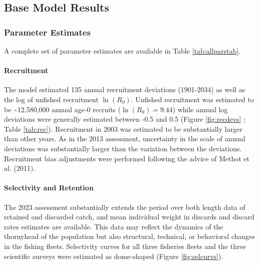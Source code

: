 \documentclass[11pt,
  english,
  letterpaper,
]{article}
\begin{document}
\hypertarget{base-model-results}{%
\subsection{Base Model Results}\label{base-model-results}}

\hypertarget{parameter-estimates}{%
\subsubsection{Parameter Estimates}\label{parameter-estimates}}

A complete set of parameter estimates are available in Table \ref{tab:allparstab}.

\hypertarget{recruitment-1}{%
\paragraph{Recruitment}\label{recruitment-1}}

The model estimated 135 annual recruitment deviations (1901-2034) as well as the log of unfished recruitment \(\ln(R_0)\). Unfished recruitment was estimated to be \textasciitilde12,580,000 annual age-0 recruits (\(\ln(R_0) = 9.44\)) while annual log deviations were generally estimated between -0.5 and 0.5 (Figure \ref{fig:recdevs} ; Table \ref{tab:rec}). Recruitment in 2003 was estimated to be substantially larger than other years. As in the 2013 assessment, uncertainty in the scale of annual deviations was substantially larger than the variation between the deviations. Recruitment bias adjustments were performed following the advice of Methot et al. (2011).

\hypertarget{selectivity-and-retention-1}{%
\paragraph{Selectivity and Retention}\label{selectivity-and-retention-1}}

The 2023 assessment substantially extends the period over both length data of retained and discarded catch, and mean individual weight in discards and discard rates estimates are available. This data may reflect the dynamics of the thornyhead of the population but also structural, technical, or behavioral changes in the fishing fleets. Selectivity curves for all three fisheries fleets and the three scientific surveys were estimated as dome-shaped (Figure \ref{fig:selcurvs}).
\end{document}
